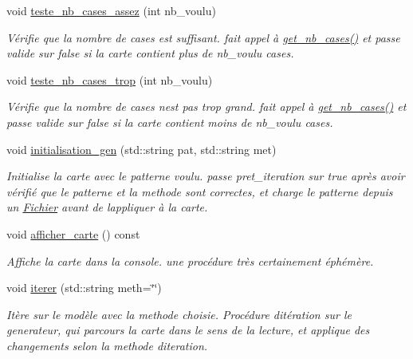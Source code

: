 \begin{DoxyCompactItemize}
void \hyperlink{classZoneGen_a881eb249ee86fa522c58e7f42f651c85}{teste\+\_\+nb\+\_\+cases\+\_\+assez} (int nb\+\_\+voulu)
\begin{DoxyCompactList}\small\item\em Vérifie que la nombre de cases est suffisant. fait appel à \hyperlink{classZoneGen_a76588fc3a5d361a213ec28692b8abcdc}{get\+\_\+nb\+\_\+cases()} et passe {\itshape valide} sur false si la {\itshape carte} contient plus de nb\+\_\+voulu cases. \end{DoxyCompactList}\item 
void \hyperlink{classZoneGen_a47825d838930c2f8657044353767f222}{teste\+\_\+nb\+\_\+cases\+\_\+trop} (int nb\+\_\+voulu)
\begin{DoxyCompactList}\small\item\em Vérifie que la nombre de cases n\textquotesingle{}est pas trop grand. fait appel à \hyperlink{classZoneGen_a76588fc3a5d361a213ec28692b8abcdc}{get\+\_\+nb\+\_\+cases()} et passe {\itshape valide} sur false si la {\itshape carte} contient moins de nb\+\_\+voulu cases. \end{DoxyCompactList}\item 
void \hyperlink{classZoneGen_aa08565e6eb38911c72143aacfced7b91}{initialisation\+\_\+gen} (std\+::string pat, std\+::string met)
\begin{DoxyCompactList}\small\item\em Initialise la {\itshape carte} avec le patterne voulu. passe {\itshape pret\+\_\+iteration} sur true après avoir vérifié que le {\itshape patterne} et la {\itshape methode} sont correctes, et charge le patterne depuis un \hyperlink{classFichier}{Fichier} avant de l\textquotesingle{}appliquer à la {\itshape carte}. \end{DoxyCompactList}\item 
void \hyperlink{classZoneGen_a79aa554fa5bee5bd1e0af2a1a505fa57}{afficher\+\_\+carte} () const 
\begin{DoxyCompactList}\small\item\em Affiche la carte dans la console. une procédure très certainement éphémère. \end{DoxyCompactList}\item 
void \hyperlink{classZoneGen_a63dfaff24d4686702b22937606da1e04}{iterer} (std\+::string meth=\char`\"{}\char`\"{})
\begin{DoxyCompactList}\small\item\em Itère sur le modèle avec la {\itshape methode} choisie. Procédure d\textquotesingle{}itération sur le generateur, qui parcours la {\itshape carte} dans le sens de la lecture, et applique des changements selon la {\itshape methode} d\textquotesingle{}iteration. \end{DoxyCompactList}\item 

\end{DoxyCompactItemize}
